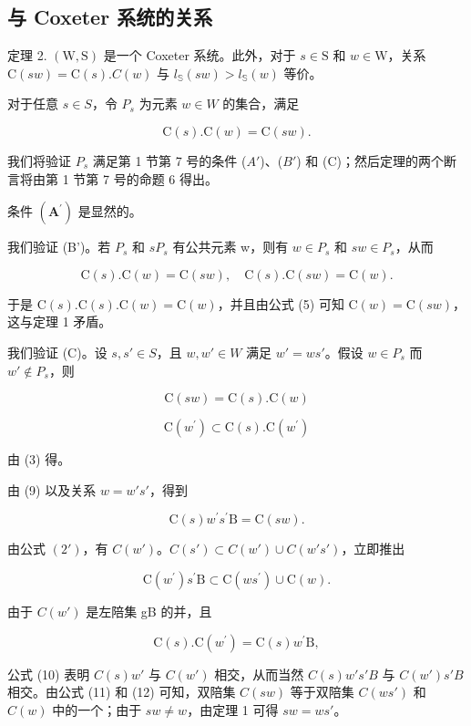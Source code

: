 \subsection{与 Coxeter 系统的关系}

定理 2. \((\mathrm{W},\mathrm{S})\) 是一个 Coxeter 系统。此外，对于 \(s\in \mathrm{S}\) 和 \(w\in \mathrm{W}\)，关系 \(\mathrm{C}(sw) = \mathrm{C}(s).C(w)\) 与 \(l_{\mathbb{S}}(sw) > l_{\mathbb{S}}(w)\) 等价。

对于任意 \(s \in S\)，令 \(P_s\) 为元素 \(w \in W\) 的集合，满足

\[
\mathrm{C} (s). \mathrm{C} (w) = \mathrm{C} (s w).
\]

我们将验证 \(P_{s}\) 满足第 1 节第 7 号的条件 (\(A'\))、(\(B'\)) 和 (C)；然后定理的两个断言将由第 1 节第 7 号的命题 6 得出。

条件 \((\mathbf{A}^{\prime})\) 是显然的。

我们验证 (B')。若 \(P_{s}\) 和 \(sP_{s}\) 有公共元素 w，则有 \(w \in P_{s}\) 和 \(sw \in P_{s}\)，从而

\[
\mathrm{C} (s). \mathrm{C} (w) = \mathrm{C} (s w), \quad \mathrm{C} (s). \mathrm{C} (s w) = \mathrm{C} (w).
\]

于是 \(\mathrm{C}(s).\mathrm{C}(s).\mathrm{C}(w) = \mathrm{C}(w)\)，并且由公式 (5) 可知 \(\mathrm{C}(w) = \mathrm{C}(sw)\)，这与定理 1 矛盾。

我们验证 (C)。设 \(s, s' \in S\)，且 \(w, w' \in W\) 满足 \(w' = ws'\)。假设 \(w \in P_s\) 而 \(w' \notin P_s\)，则

\[
\mathrm{C} (s w) = \mathrm{C} (s). \mathrm{C} (w)\tag{9}
\]

\[
\mathrm{C} (w ^ {\prime}) \subset \mathrm{C} (s). \mathrm{C} (w ^ {\prime})\tag{10}
\]

由 (3) 得。

由 (9) 以及关系 \(w = w's'\)，得到

\[
\mathrm{C} (s) w ^ {\prime} s ^ {\prime} \mathrm{B} = \mathrm{C} (s w).\tag{11}
\]

由公式 \((2')\)，有 \(C(w')\)。\(C(s') \subset C(w') \cup C(w's')\)，立即推出

\[
\mathrm{C} (w ^ {\prime}) s ^ {\prime} \mathrm{B} \subset \mathrm{C} (w s ^ {\prime}) \cup \mathrm{C} (w).\tag{12}
\]

由于 \(C(w')\) 是左陪集 gB 的并，且

\[
\mathrm{C} (s). \mathrm{C} (w ^ {\prime}) = \mathrm{C} (s) w ^ {\prime} \mathrm{B},
\]

公式 (10) 表明 \(C(s)w'\) 与 \(C(w')\) 相交，从而当然 \(C(s)w's'B\) 与 \(C(w')s'B\) 相交。由公式 (11) 和 (12) 可知，双陪集 \(C(sw)\) 等于双陪集 \(C(ws')\) 和 \(C(w)\) 中的一个；由于 \(sw \neq w\)，由定理 1 可得 \(sw = ws'\)。

